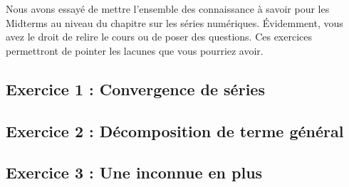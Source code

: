\noindent Nous avons essayé de mettre l'ensemble des connaissance à savoir pour les Midterms au niveau du chapitre sur les séries numériques. Évidemment, vous avez le droit de relire le cours ou de poser des questions. Ces exercices permettront de pointer les lacunes que vous pourriez avoir.

\subsection{Exercice 1 : Convergence de séries}

\vspace{10px}

\subsection{Exercice 2 : Décomposition de terme général}

\vspace{10px}

\subsection{Exercice 3 : Une inconnue en plus}

\vspace{10px}